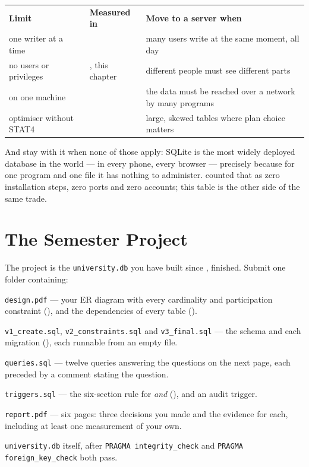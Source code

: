 \begin{conceptbox}
\begin{tabular}{@{}L{4.4cm}L{4.4cm}L{5.0cm}@{}}
\textbf{Limit} & \textbf{Measured in} & \textbf{Move to a server when} \\
one writer at a time &  & many users write at the same
  moment, all day \\
no users or privileges & , this chapter & different people
  must see different parts \\
on one machine &  & the data must be reached over a
  network by many programs \\
optimiser without STAT4 &  & large, skewed tables where plan
  choice matters \\
\end{tabular}

\smallskip
And stay with it when none of those apply: SQLite is the most widely deployed
database in the world --- in every phone, every browser --- precisely because
for one program and one file it has nothing to administer. 
counted that as zero installation steps, zero ports and zero accounts; this
table is the other side of the same trade.
\end{conceptbox}

\section{The Semester Project}

\begin{definitionbox}
The project is the \texttt{university.db} you have built since
, finished. Submit one folder containing:

\begin{tightnum}
  \item \texttt{design.pdf} --- your ER diagram with every cardinality and
        participation constraint (), and the dependencies
        of every table ().
  \item \texttt{v1\_create.sql}, \texttt{v2\_constraints.sql} and
        \texttt{v3\_final.sql} --- the schema and each migration
        (), each runnable from an empty file.
  \item \texttt{queries.sql} --- twelve queries answering the questions on
        the next page, each preceded by a comment stating the question.
  \item \texttt{triggers.sql} --- the six-section rule for 
        \emph{and}  (), and an audit trigger.
  \item \texttt{report.pdf} --- six pages: three decisions you made and the
        evidence for each, including at least one measurement of your own.
  \item \texttt{university.db} itself, after \texttt{PRAGMA
        integrity\_check} and \texttt{PRAGMA foreign\_key\_check} both pass.
\end{tightnum}
\end{definitionbox}

